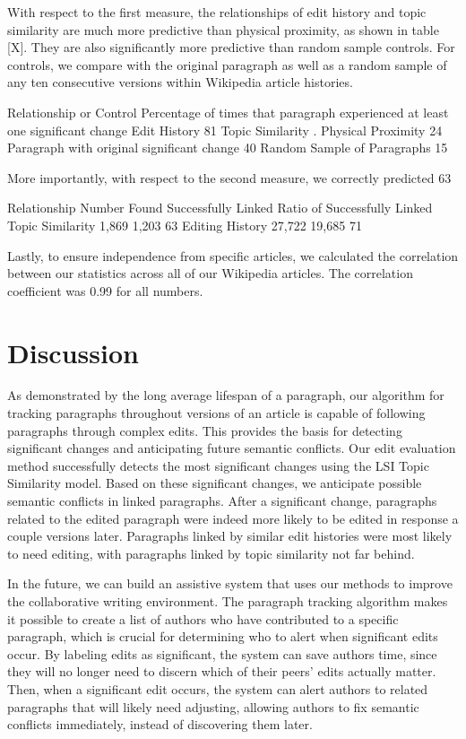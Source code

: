 With respect to the first measure, the relationships of edit history and
topic similarity are much more predictive than physical proximity, as
shown in table {[}X{]}. They are also significantly more predictive than
random sample controls. For controls, we compare with the original
paragraph as well as a random sample of any ten consecutive versions
within Wikipedia article histories.

Relationship or Control Percentage of times that paragraph experienced
at least one significant change Edit History 81 Topic Similarity .
Physical Proximity 24 Paragraph with original significant change 40
Random Sample of Paragraphs 15

More importantly, with respect to the second measure, we correctly
predicted 63

Relationship Number Found Successfully Linked Ratio of Successfully
Linked Topic Similarity 1,869 1,203 63 Editing History 27,722 19,685 71

Lastly, to ensure independence from specific articles, we calculated the
correlation between our statistics across all of our Wikipedia articles.
The correlation coefficient was 0.99 for all numbers.

\section{Discussion}\label{discussion}

As demonstrated by the long average lifespan of a paragraph, our
algorithm for tracking paragraphs throughout versions of an article is
capable of following paragraphs through complex edits. This provides the
basis for detecting significant changes and anticipating future semantic
conflicts. Our edit evaluation method successfully detects the most
significant changes using the LSI Topic Similarity model. Based on these
significant changes, we anticipate possible semantic conflicts in linked
paragraphs. After a significant change, paragraphs related to the edited
paragraph were indeed more likely to be edited in response a couple
versions later. Paragraphs linked by similar edit histories were most
likely to need editing, with paragraphs linked by topic similarity not
far behind.

In the future, we can build an assistive system that uses our methods to
improve the collaborative writing environment. The paragraph tracking
algorithm makes it possible to create a list of authors who have
contributed to a specific paragraph, which is crucial for determining
who to alert when significant edits occur. By labeling edits as
significant, the system can save authors time, since they will no longer
need to discern which of their peers' edits actually matter. Then, when
a significant edit occurs, the system can alert authors to related
paragraphs that will likely need adjusting, allowing authors to fix
semantic conflicts immediately, instead of discovering them later.

